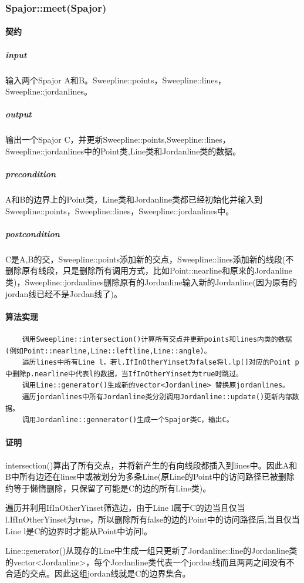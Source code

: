 \documentclass[a4paper]{book}
\numberwithin{equation}{chapter}
\theoremstyle{definition}
\begin{document}
\subsubsection{Spajor::meet(Spajor)}
\paragraph{契约}
\subparagraph{input}
输入两个Spajor A和B。Sweepline::points，Sweepline::lines，Sweepline::jordanlines。
\subparagraph{output}
输出一个Spajor C，并更新Sweepline::points,Sweepline::lines，Sweepline::jordanlines中的Point类,Line类和Jordanline类的数据。
\subparagraph{precondition}
A和B的边界上的Point类，Line类和Jordanline类都已经初始化并输入到Sweepline::points，Sweepline::lines，Sweepline::jordanlines中。
\subparagraph{postcondition}
C是A,B的交，Sweepline::points添加新的交点，Sweepline::lines添加新的线段(不删除原有线段，只是删除所有调用方式，比如Point::nearline和原来的Jordanline类)，Sweepline::jordanlines删除原有的Jordanline输入新的Jordanline(因为原有的jordan线已经不是Jordan线了)。
\paragraph{算法实现}
\begin{lstlisting}
	调用Sweepline::intersection()计算所有交点并更新points和lines内类的数据(例如Point::nearline,Line::leftline,Line::angle)。
	遍历lines中所有Line l，若l.IfInOtherYinset为false将l.lp[]对应的Point p 中删除p.nearline中代表l的数据，当IfInOtherYinset为true时跳过。
	调用Line::generator()生成新的vector<Jordanline> 替换原jordanlines。
	遍历jordanlines中所有Jordanline类分别调用Jordanline::update()更新内部数据。
	调用Jordanline::gennerator()生成一个Spajor类C，输出C。
\end{lstlisting}
\paragraph{证明}
	intersection()算出了所有交点，并将新产生的有向线段都插入到lines中。因此A和B中所有边还在lines中或被划分为多条Line(原Line的Point中的访问路径已被删除约等于懒惰删除，只保留了可能是C的边的所有Line类)。
	
	遍历并利用IfInOtherYinset筛选边，由于Line l属于C的边当且仅当l.IfInOtherYinset为true，所以删除所有false的边的Point中的访问路径后,当且仅当Line l是C的边界时才能从Point中访问l。
	
	Line::generator()从现存的Line中生成一组只更新了Jordanline::line的Jordanline类的vector<Jordanline>，每个Jordanline类代表一个jordan线而且两两之间没有不合适的交点。因此这组jordan线就是C的边界集合。
	
\end{document}
